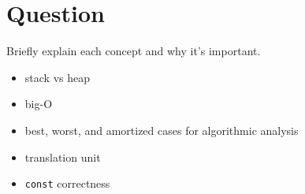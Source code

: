 




\docCopyright

\section{Question}

Briefly explain each concept and why it's important.
\textQuestion{\makeDashedLine}
\begin{itemize}
  \item stack vs heap
    \vfill\textQuestion{\makeDashedLine}
  \item big-O
    \vfill\textQuestion{\makeDashedLine}
  \item best, worst, and amortized cases for algorithmic analysis
    \vfill\vfill\textQuestion{\makeDashedLine}
  \item translation unit
    \vfill\textQuestion{\makeDashedLine}
  \item \texttt{const} correctness
    \vfill
\end{itemize}



